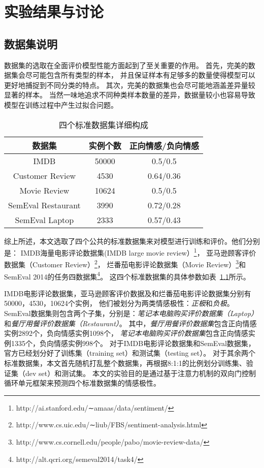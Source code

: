 
\chapter{实验结果与讨论}
\label{chapter-basic}

\section{数据集说明}
数据集的选取在全面评价模型性能方面起到了至关重要的作用。
首先，完美的数据集会尽可能包含所有类型的样本，
并且保证样本有足够多的数量使得模型可以更好地捕捉到不同分类的特点。
其次，完美的数据集也会尽可能地涵盖差异量较显著的样本。
当然一味地追求不同种类样本数量的差异，数据量较小也容易导致模型在训练过程中产生过拟合问题。

\begin{table}[h!]
    \centering
    \caption{四个标准数据集详细构成}
    \label{Table:datasets}
    \begin{tabular}{@{}ccc@{}}
        \hline
        数据集 & 实例个数 & 正向情感/负向情感 \\ \hline
        IMDB & 50000 & 0.5/0.5   \\
        Customer Review & 4530 & 0.64/0.36 \\
        Movie Review & 10624 & 0.5/0.5   \\
        SemEval Restaurant & 3990 & 0.72/0.28 \\
        SemEval Laptop & 2333 & 0.57/0.43 \\ \hline
    \end{tabular}
\end{table}

综上所述，本文选取了四个公共的标准数据集来对模型进行训练和评价。他们分别是：
IMDB海量电影评论数据集(IMDB large movie review）\footnote{http://ai.stanford.edu/∼amaas/data/sentiment/}，
亚马逊顾客评价数据集（Customer Review）\footnote{http://www.cs.uic.edu/∼liub/FBS/sentiment-analysis.html}，
烂番茄电影评论数据集（Movie Review）\footnote{http://www.cs.cornell.edu/people/pabo/movie-review-data/}和
SemEval 2014的任务四数据集\footnote{http://alt.qcri.org/semeval2014/task4/}。
这四个标准数据集的具体参数如表~\ref{Table:datasets}所示。

IMDB电影评论数据集，亚马逊顾客评价数据及和烂番茄电影评论数据集分别有50000，4530，10624个实例，
他们被划分为两类情感极性：\emph{正极}和\emph{负极}。
SemEval数据集则包含两个子集，分别是：\emph{笔记本电脑购买评价数据集（Laptop）}和\emph{餐厅用餐评价数据集（Restaurant）}。
其中，\emph{餐厅用餐评价数据集}包含正向情感实例2892个，负向情感实例1098个，
\emph{笔记本电脑购买评价数据集}包含正向情感实例1335个，负向情感实例998个。
对于IMDB电影评论数据集和SemEval数据集，官方已经划分好了训练集（training set）和测试集（testing set）。
对于其余两个标准数据集，本文首先随机打乱整个数据集，再根据8:1:1的比例划分训练集、验证集（dev set）和测试集。
本文的实验目的是通过基于注意力机制的双向门控制循环单元框架来预测四个标准数据集的情感极性。

